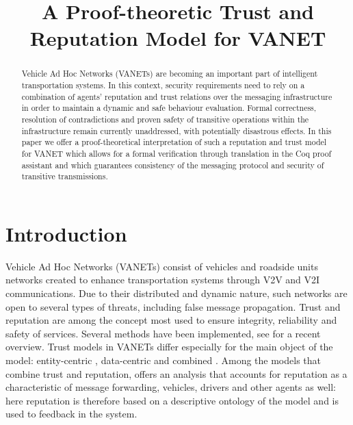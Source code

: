 \documentclass[compsoc, conference, letterpaper, 10pt, times]{IEEEtran}
\begin{document}
\title{A Proof-theoretic Trust and Reputation Model for VANET}


\author{
	}


\maketitle

\begin{abstract}
Vehicle Ad Hoc Networks (VANETs) are becoming an important part of intelligent transportation systems. In this context, security requirements need to rely on a combination of agents' reputation and trust relations over the messaging infrastructure in order to maintain a dynamic and safe behaviour evaluation. Formal correctness, resolution of contradictions and proven safety of transitive operations within the infrastructure remain currently unaddressed, with potentially disastrous effects. In this paper we offer a proof-theoretical interpretation of such a reputation and trust model for VANET which allows for a formal verification through translation in the Coq proof assistant and which guarantees consistency of the messaging protocol and security of transitive transmissions.
\end{abstract}


\section{Introduction}\label{sec:intro}

Vehicle Ad Hoc Networks (VANETs) consist of vehicles and roadside units networks created to enhance transportation systems through V2V and V2I communications. Due to their distributed and dynamic nature, such networks are open to several types of threats, including false message propagation. Trust and reputation are among the concept most used to ensure integrity, reliability  and safety of services. Several methods have been implemented, see \cite{Soleymani2015} for a recent overview. Trust models in VANETs differ especially for the main object of the model: entity-centric \cite{5641621, GomezMarmol:2012:TTR:2160992.2161100}, data-centric \cite{conf/infocom/RayaPGH08, Lo2009} and combined \cite{Wei2012}. Among the models that combine trust and reputation, \cite{glenford} offers an analysis that accounts for reputation as a characteristic of message forwarding, vehicles, drivers and other agents as well: here reputation is therefore based on a descriptive ontology of the model and is used to feedback in the system. 
\end{document}
